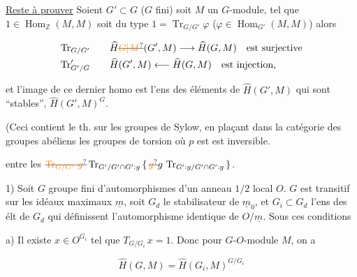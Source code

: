 \uline{Reste à prouver} Soient $G'\subset G$ ($G$ fini) soit $M$ un $G$-module, tel que $1\in\operatorname{Hom}_{\mathbb Z}(M,M)$ soit du type $1=\operatorname{Tr}_{G/G'}\varphi$  ($\varphi\in\operatorname{Hom}_{G'}(M,M)$) alors

\[\begin{aligned}
\operatorname{Tr}_{G/G'}\qquad &\widehat H\deleted{\unsure{G|M}}(G',M)\longrightarrow\widehat H(G,M)\quad\text{est surjective}\\
\operatorname{Tr}'_{G'/G}\qquad &\widehat H(G',M)\longleftarrow\widehat H(G,M)\quad\text{est injection,}
\end{aligned}\]

et l'image de ce dernier homo est l'ens des éléments de $\widehat H(G',M)$ qui sont ``stables'',  $\widehat H(G',M)^G$.


(Ceci contient le th. sur les groupes de Sylow, en plaçant dans la catégorie des groupes abéliens   les groupes de torsion où $p$ est est inversible.

 entre les  $\deleted{\unsure{\operatorname{Tr}_{G/G'}\,g}}\operatorname{Tr}_{G'/G'\cap G':g}\,\{\,\deleted{\unsure{g}}g\,\operatorname{Tr}_{G':g/G'\cap G':g}\,\}$.



1) Soit $G$ groupe fini d'automorphismes d'un anneau $1/2$ local $O$. $G$ est transitif sur les idéaux maximaux $\underline m$, soit $G_d$ le stabilisateur de $\underline m_0$, et $G_i\subset G_d$ l'ens des élt de $G_d$ qui définissent l'automorphisme identique de $O/\underline m$. Sous ces conditions

a) Il existe $x\in O^{G_i}$ tel que $T_{G/G_i}\,x=1$. Donc pour  $G$-$O$-module $M$, on a

\[\widehat H(G,M)=\widehat H(G_i,M)^{G/G_i}\]

